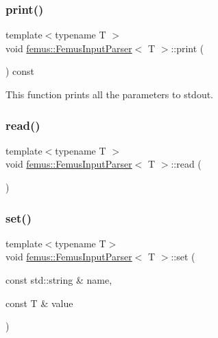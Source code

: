 \subsubsection{\texorpdfstring{print()}{print()}}
{\footnotesize\ttfamily template$<$typename T $>$ \\
void \mbox{\hyperlink{classfemus_1_1_femus_input_parser}{femus\+::\+Femus\+Input\+Parser}}$<$ T $>$\+::print (\begin{DoxyParamCaption}{ }\end{DoxyParamCaption}) const}



This function prints all the parameters to stdout. 

\mbox{\label{classfemus_1_1_femus_input_parser_a5ac476036f43e888b305f2a4844e2e57}} 
\subsubsection{\texorpdfstring{read()}{read()}}
{\footnotesize\ttfamily template$<$typename T $>$ \\
void \mbox{\hyperlink{classfemus_1_1_femus_input_parser}{femus\+::\+Femus\+Input\+Parser}}$<$ T $>$\+::read (\begin{DoxyParamCaption}{ }\end{DoxyParamCaption})}

\mbox{\label{classfemus_1_1_femus_input_parser_acbc42027ebef9bad38afd4e0bdef4169}} 
\subsubsection{\texorpdfstring{set()}{set()}}
{\footnotesize\ttfamily template$<$typename T$>$ \\
void \mbox{\hyperlink{classfemus_1_1_femus_input_parser}{femus\+::\+Femus\+Input\+Parser}}$<$ T $>$\+::set (\begin{DoxyParamCaption}\item[{const std\+::string \&}]{name,  }\item[{const T \&}]{value }\end{DoxyParamCaption})}



